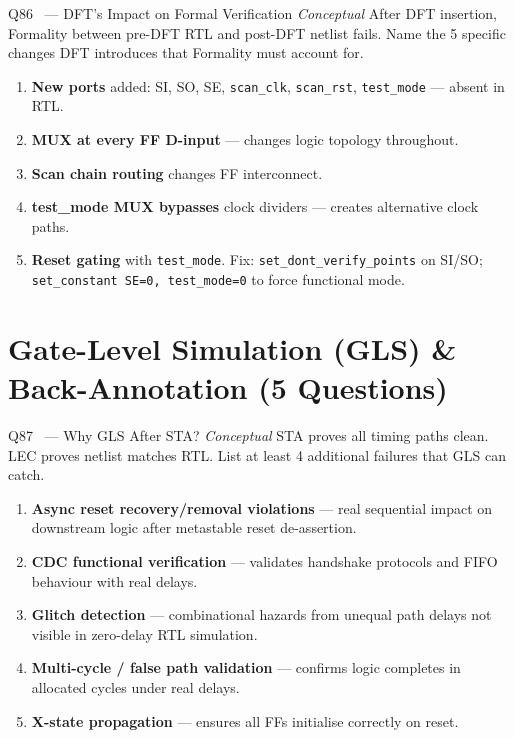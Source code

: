 \documentclass[12pt,a4paper]{article}
\newcommand{\advanced}{%
  \fbox{\textcolor{advred}{\bfseries\sffamily\small ADVANCED}}}
\newcommand{\moderate}{%
  \fbox{\textcolor{modoran}{\bfseries\sffamily\small MODERATE}}}
\begin{document}
\begin{questionbox}{Q86 \advanced\ --- DFT's Impact on Formal Verification \hfill\textit{Conceptual}}
After DFT insertion, Formality between pre-DFT RTL and post-DFT netlist fails. Name the 5 specific changes DFT introduces that Formality must account for.
\end{questionbox}

\begin{answerbox}
\begin{enumerate}
  \item \textbf{New ports} added: SI, SO, SE, \texttt{scan\_clk}, \texttt{scan\_rst}, \texttt{test\_mode} --- absent in RTL.
  \item \textbf{MUX at every FF D-input} --- changes logic topology throughout.
  \item \textbf{Scan chain routing} changes FF interconnect.
  \item \textbf{test\_mode MUX bypasses} clock dividers --- creates alternative clock paths.
  \item \textbf{Reset gating} with \texttt{test\_mode}.
  Fix: \texttt{set\_dont\_verify\_points} on SI/SO; \texttt{set\_constant SE=0, test\_mode=0} to force functional mode.
\end{enumerate}
\end{answerbox}

\section{Gate-Level Simulation (GLS) \& Back-Annotation (5 Questions)}
\label{sec:gls}

\begin{questionbox}{Q87 \moderate\ --- Why GLS After STA? \hfill\textit{Conceptual}}
STA proves all timing paths clean. LEC proves netlist matches RTL. List at least 4 additional failures that GLS can catch.
\end{questionbox}

\begin{answerbox}
\begin{enumerate}
  \item \textbf{Async reset recovery/removal violations} --- real sequential impact on downstream logic after metastable reset de-assertion.
  \item \textbf{CDC functional verification} --- validates handshake protocols and FIFO behaviour with real delays.
  \item \textbf{Glitch detection} --- combinational hazards from unequal path delays not visible in zero-delay RTL simulation.
  \item \textbf{Multi-cycle / false path validation} --- confirms logic completes in allocated cycles under real delays.
  \item \textbf{X-state propagation} --- ensures all FFs initialise correctly on reset.
\end{enumerate}
\end{answerbox}
\end{document}

